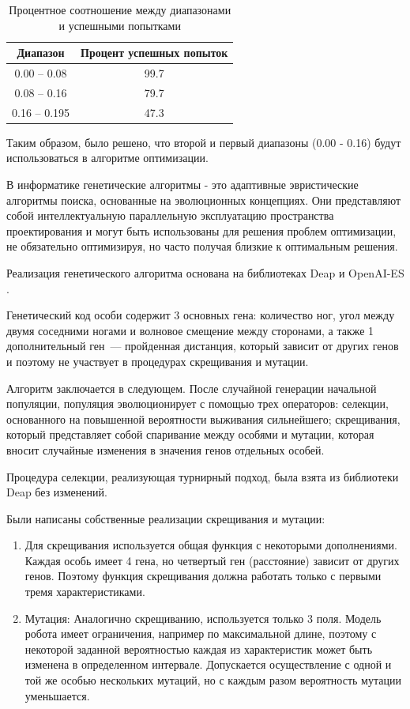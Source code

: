 \begin{table}[H]
\caption{Процентное соотношение между диапазонами и успешными попытками}
\label{tabular:ranges}
\centering
\begin{tabular}{c|c}
 \textbf{Диапазон} & \textbf{Процент успешных попыток}\\
 \hline
0.00 -- 0.08 & 99.7 \\ 
0.08 -- 0.16 & 79.7 \\
0.16 -- 0.195 & 47.3 \\
\end{tabular}
\end{table}


Таким образом, было решено, что второй и первый диапазоны (0.00 - 0.16) будут использоваться в алгоритме оптимизации.

В информатике генетические алгоритмы - это адаптивные эвристические алгоритмы поиска, основанные на эволюционных концепциях. Они представляют собой интеллектуальную параллельную эксплуатацию пространства проектирования и могут быть использованы для решения проблем оптимизации, не обязательно оптимизируя, но часто получая близкие к оптимальным решения. 

Реализация генетического алгоритма основана на библиотеках Deap  и OpenAI-ES \cite{DEAP_JMLR2012,salimans_Evolution_2017}.

Генетический код особи содержит 3 основных гена: количество ног, угол между двумя соседними ногами и волновое смещение между сторонами, а также 1 дополнительный ген~--- пройденная дистанция, который зависит от других генов и поэтому не участвует в процедурах скрещивания и мутации. 

Алгоритм заключается в следующем. После случайной генерации начальной популяции, популяция эволюционирует с помощью трех операторов: селекции, основанного на повышенной вероятности выживания сильнейшего; скрещивания, который представляет собой спаривание между особями и мутации, которая вносит случайные изменения в значения генов отдельных особей.

Процедура селекции, реализующая турнирный подход, была взята из библиотеки Deap без изменений. 

Были написаны собственные реализации скрещивания и мутации:
\begin{enumerate}
\item Для скрещивания используется общая функция с некоторыми дополнениями. Каждая особь имеет 4 гена, но четвертый ген (расстояние) зависит от других генов. Поэтому функция скрещивания должна работать только с первыми тремя характеристиками.

\item Мутация: Аналогично скрещиванию, используется только 3 поля. Модель робота имеет ограничения, например по максимальной длине, поэтому с некоторой заданной вероятностью каждая из характеристик может быть изменена в определенном интервале. Допускается осуществление с одной и той же особью нескольких мутаций, но с каждым разом вероятность мутации уменьшается. 
\end{enumerate}

